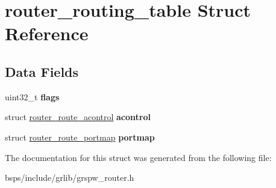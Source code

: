 \hypertarget{structrouter__routing__table}{}\section{router\+\_\+routing\+\_\+table Struct Reference}
\label{structrouter__routing__table}
\subsection*{Data Fields}
\begin{DoxyCompactItemize}
\item 
\mbox{\label{structrouter__routing__table_aebe7beea90ed2536b8a46ff314725707}} 
uint32\+\_\+t {\bfseries flags}
\item 
\mbox{\label{structrouter__routing__table_a104a17da058d91022d275a9da0e8fa63}} 
struct \mbox{\hyperlink{structrouter__route__acontrol}{router\+\_\+route\+\_\+acontrol}} {\bfseries acontrol}
\item 
\mbox{\label{structrouter__routing__table_aa3582a2c545441384126e3ca4e326d89}} 
struct \mbox{\hyperlink{structrouter__route__portmap}{router\+\_\+route\+\_\+portmap}} {\bfseries portmap}
\end{DoxyCompactItemize}


The documentation for this struct was generated from the following file\+:\begin{DoxyCompactItemize}
\item 
bsps/include/grlib/grspw\+\_\+router.\+h\end{DoxyCompactItemize}
